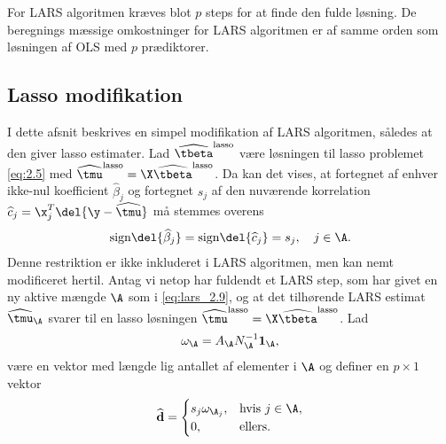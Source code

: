 For LARS algoritmen kræves blot \(p\) steps for at finde den fulde løsning.
De beregnings mæssige omkostninger for LARS algoritmen er af samme orden som løsningen af OLS med \(p\) prædiktorer.


\subsection{Lasso modifikation} \label{subsec:lasso_modifikation}
I dette afsnit beskrives en simpel modifikation af LARS algoritmen, således at den giver lasso estimater.
Lad \(\widehat{\tbeta}^\text{lasso}\) være løsningen til lasso problemet \eqref{eq:2.5} med \(\widehat{\tmu}^\text{lasso} = \X \widehat{\tbeta}^\text{lasso}\).
Da kan det vises, at fortegnet af enhver ikke-nul koefficient \(\widehat{\beta}_j\) og fortegnet \(s_j\) af den nuværende korrelation \(\widehat{c}_j = \x_j^T \del{\y - \widehat{\tmu}}\) må stemmes overens
\begin{align}
\text{sign} \del{\widehat{\beta}_j } = \text{sign} \del{\widehat{c}_j } = s_j, \quad j \in \A. \label{eq:lars_3.1}
\end{align}
%
%
Denne restriktion er ikke inkluderet i LARS algoritmen, men kan nemt modificeret hertil. 
Antag vi netop har fuldendt et LARS step, som har givet en ny aktive mængde \(\A\) som i \eqref{eq:lars_2.9}, og at det tilhørende LARS estimat \(\widehat{\tmu}_\A\) svarer til en lasso løsningen \(\widehat{\tmu}^\text{lasso} = \X \widehat{\tbeta}^\text{lasso}\).
Lad
\begin{align*}
\omega_\A = A_\A N_\A^{-1} \mathbf{1}_\A,
\end{align*}
være en vektor med længde lig antallet af elementer i \(\A\) og definer en \(p \times 1\) vektor
\begin{align*}
\widehat{\mathbf{d}} = \begin{cases}
s_j \omega_{\A_j}, &\text{hvis } j \in \A, \\
0, & \text{ellers}.
\end{cases}
\end{align*}
